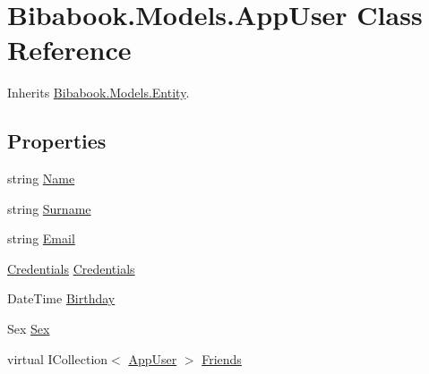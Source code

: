 \hypertarget{class_bibabook_1_1_models_1_1_app_user}{}\section{Bibabook.\+Models.\+App\+User Class Reference}
\label{class_bibabook_1_1_models_1_1_app_user}


Inherits \hyperlink{class_bibabook_1_1_models_1_1_entity}{Bibabook.\+Models.\+Entity}.

\subsection*{Properties}
\begin{DoxyCompactItemize}
\item 
string \hyperlink{class_bibabook_1_1_models_1_1_app_user_aee57e30c2750473ba7327beb843c460d}{Name}
\item 
string \hyperlink{class_bibabook_1_1_models_1_1_app_user_aac165e3467b1c5ac86c5c4972107f952}{Surname}
\item 
string \hyperlink{class_bibabook_1_1_models_1_1_app_user_ae88c5f30604127c23a4ae2bdf3015009}{Email}
\item 
\hyperlink{class_bibabook_1_1_models_1_1_credentials}{Credentials} \hyperlink{class_bibabook_1_1_models_1_1_app_user_a2f332a8cab99553e9fe9158c38180283}{Credentials}
\item 
Date\+Time \hyperlink{class_bibabook_1_1_models_1_1_app_user_a134b30cd39e6c90f421e5bb4b860bca0}{Birthday}
\item 
Sex \hyperlink{class_bibabook_1_1_models_1_1_app_user_a2130ea655fc647a8331fe0d17bc48808}{Sex}
\item 
virtual I\+Collection$<$ \hyperlink{class_bibabook_1_1_models_1_1_app_user}{App\+User} $>$ \hyperlink{class_bibabook_1_1_models_1_1_app_user_a53cdc07d5bb00e65d8541c8bf9cecf9e}{Friends}

\end{DoxyCompactItemize}
